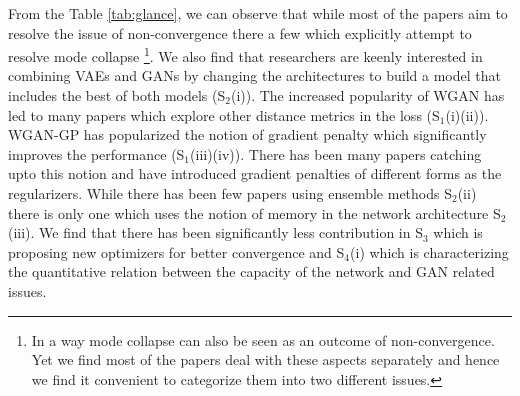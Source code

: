 From the Table \ref{tab:glance}, we can observe that while most of the papers aim to resolve the issue of non-convergence there a few which explicitly attempt to resolve mode collapse \footnote{In a way mode collapse can also be seen as an outcome of non-convergence. Yet we find most of the papers deal with these aspects separately and hence we find it convenient to categorize them into two different issues. }. We also find that researchers are keenly interested in combining VAEs and GANs by changing the architectures to build a model that includes the best of both models (S$_2$(i)). The increased popularity of WGAN has led to many papers which explore other distance metrics in the loss (S$_1$(i)(ii)). WGAN-GP has  popularized the notion of gradient penalty which significantly improves the performance (S$_1$(iii)(iv)). There has been many papers catching upto this notion and have introduced gradient penalties of different forms as the regularizers. While there has been few papers using ensemble methods S$_2$(ii) there is only one which uses the notion of memory in the network architecture S$_2$(iii). We find that there has been significantly less contribution in S$_3$ which is proposing new optimizers for better convergence and S$_4$(i) which is characterizing the quantitative relation between the capacity of the network and GAN related issues.

